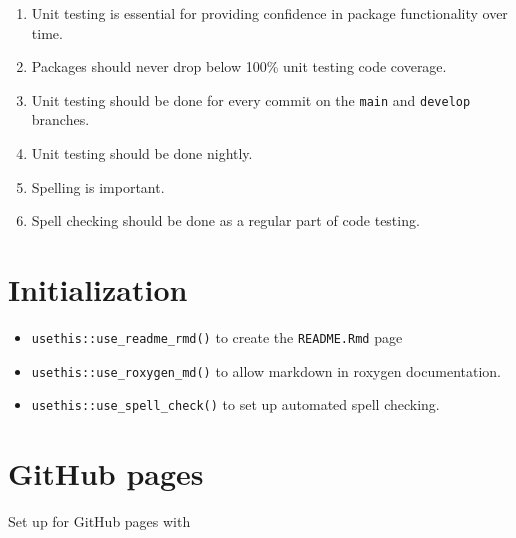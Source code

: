 \documentclass{article}
\begin{document}
\begin{enumerate}

  \item Unit testing is essential for providing confidence in package functionality over time.
  
  \item Packages should never drop below 100\% unit testing code coverage.
  
  \item Unit testing should be done for every commit on the \texttt{main} and \texttt{develop}
        branches.
		
  \item Unit testing should be done nightly.
  
  \item Spelling is important.
  
  \item Spell checking should be done as a regular part of code testing.

\end{enumerate}


\section{Initialization}
\label{sec:initialiation}

\begin{itemize}

  \item \verb|usethis::use_readme_rmd()| to create the \verb|README.Rmd| page

  \item \verb|usethis::use_roxygen_md()| to allow markdown in roxygen documentation.
  
  \item \verb|usethis::use_spell_check()| to set up automated spell checking.

\end{itemize}


\section{GitHub pages}
\label{sec:github_pages_setup}

Set up for GitHub pages with
\end{document}
